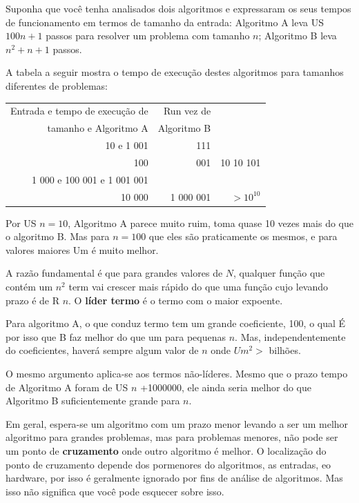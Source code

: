 \documentclass[10pt]{book}
\begin{document}
\begin{exercise}
\begin{v erbatim}
Suponha que você tenha analisados ​​dois algoritmos e expressaram
os seus tempos de funcionamento em termos de tamanho da entrada:
Algoritmo A leva US $ 100n +1 $ passos para resolver um problema com
tamanho $ n $; Algoritmo B leva $ n ^ 2 + n + 1 $ passos.

A tabela a seguir mostra o tempo de execução destes algoritmos
para tamanhos diferentes de problemas:

\begin{tabular} {| r | r | r |}
\hline
Entrada e tempo de execução de & Run vez de \\
tamanho e Algoritmo A & Algoritmo B \\
\hline
10 e 1 001 & 111 \\
100 & 001 & 10 10 101 \\
1 000 e 100 001 e 1 001 001 \\
10 000 & 1 000 001 & $> 10 ^ {10} $ \\
\hline
\end{tabular}

Por US $ n = 10 $, Algoritmo A parece muito ruim, toma quase 10 vezes
mais do que o algoritmo B. Mas para $ n = 100 $ que eles são praticamente os mesmos, e
para valores maiores Um é muito melhor.

A razão fundamental é que para grandes valores de $ N $, qualquer função
que contém um $ n ^ 2 $ term vai crescer mais rápido do que uma função cujo
levando prazo é de R $ n $. O {\bf líder termo} é o termo com o
maior expoente.

Para algoritmo A, o que conduz termo tem um grande coeficiente, 100, o qual
É por isso que B faz melhor do que um para pequenas $ n $. Mas, independentemente do
coeficientes, haverá sempre algum valor de $ n $ onde
$ Um ^ 2> $ bilhões.

O mesmo argumento aplica-se aos termos não-líderes. Mesmo que o prazo
tempo de Algoritmo A foram de US $ n $ +1000000, ele ainda seria melhor do que
Algoritmo B suficientemente grande para $ n $.

Em geral, espera-se um algoritmo com um prazo menor levando a ser um
melhor algoritmo para grandes problemas, mas para problemas menores, não
pode ser um ponto de {\bf cruzamento} onde outro algoritmo é melhor. O
localização do ponto de cruzamento depende dos pormenores do
algoritmos, as entradas, eo hardware, por isso é geralmente ignorado por
fins de análise de algoritmos. Mas isso não significa que você pode esquecer
sobre isso.


\end{v erbatim}
\end{exercise}
\end{document}
